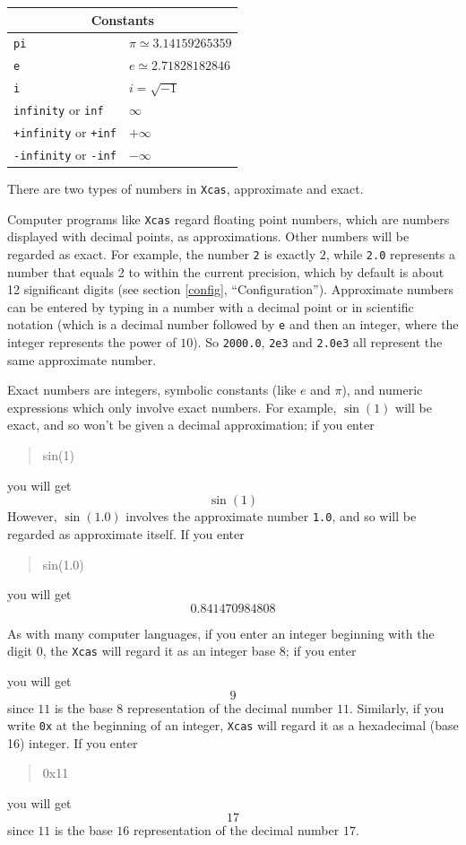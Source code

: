 \documentclass{article}
\newcommand{\xcasin}[1]
{\begin{quote}\ttfamily
#1
\end{quote}}
\newcommand{\xcasout}[1]
{\begin{equation*}
#1
\end{equation*}}
\begin{document}
\begin{center}
\begin{tabular}{|p{}|p{}|}
\hline
\multicolumn{2}{|c|}{\textbf{Constants}}\\
\hline\hline
\texttt{pi}  & $\pi\simeq 3.14159265359$ \\
\texttt{e}   & $e \simeq 2.71828182846$  \\
\texttt{i}   & $i=\sqrt{-1}$  \\
\texttt{infinity} or \texttt{inf}   & $\infty$  \\
\texttt{+infinity} or \texttt{+inf} & $+\infty$  \\
\texttt{-infinity} or \texttt{-inf} & $-\infty$  \\
\hline
\end{tabular}
\end{center}


There are two types of numbers in \texttt{Xcas}, approximate and exact.

Computer programs like \texttt{Xcas} regard floating point numbers,
which are numbers displayed with decimal points, as approximations.  Other
numbers will be regarded as exact.  For example, the number
\texttt{2} is exactly $2$, while \texttt{2.0} represents a number that
equals 2 to within the current precision, which by default is about 12
significant digits (see section \ref{config}, ``Configuration'').
Approximate numbers can be entered by
typing in a number with a decimal point or in scientific notation
(which is a decimal number followed by \texttt{e} and then an integer,
where the integer represents the power of $10$).  So \texttt{2000.0},
\texttt{2e3} and \texttt{2.0e3} all represent the same approximate
number.

Exact numbers are integers, symbolic constants (like $e$ and $\pi$),
and numeric expressions which only involve exact numbers.  For example,
$\sin(1)$ will be exact, and so won't be given a decimal
approximation; if you enter
\xcasin{sin(1)}
you will get
\xcasout{\sin(1)}
However, $\sin(1.0)$ involves the approximate number \texttt{1.0}, and
so will be regarded as approximate itself.  If you enter
\xcasin{sin(1.0)}
you will get
\xcasout{0.841470984808}

As with many computer languages, if you enter an integer beginning
with the digit $0$, the \texttt{Xcas} will regard it as an integer
base 8; if you enter
\xcasin{011}
you will get
\xcasout{9}
since $11$ is the base $8$ representation of the decimal number $11$.
Similarly, if you write \texttt{0x} at the beginning of an integer,
\texttt{Xcas} will regard it as a hexadecimal (base 16) integer.  If
you enter
\xcasin{0x11}
you will get
\xcasout{17}
since $11$ is the base $16$ representation of the decimal number $17$.
\end{document}
